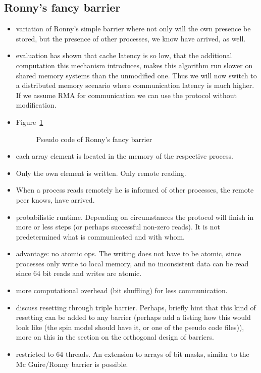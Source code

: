 \documentclass[a4paper, 10pt]{article}
\begin{document}
\subsection{Ronny's fancy barrier}
\label{ssec:new-fancy}
\begin{itemize}
	\item variation of Ronny's simple barrier where not only will the own presence be stored, but the presence of other processes, we know have arrived, as well.
	\item evaluation has shown that cache latency is so low, that the additional computation this mechanism introduces, makes this algorithm run slower on shared memory systems than the unmodified one. Thus we will now switch to a distributed memory scenario where communication latency is much higher. If we assume RMA for communication we can use the protocol without modification.
	\item Figure~\ref{fig:pseudo-code-ronny-fancy}
		\begin{figure}[htbp]
			\centering
			
			\caption{Pseudo code of Ronny's fancy barrier}
			\label{fig:pseudo-code-ronny-fancy}
		\end{figure}
	\item each array element is located in the memory of the respective process.
	\item Only the own element is written. Only remote reading.
	\item When a process reads remotely he is informed of other processes, the remote peer knows, have arrived.
	\item probabilistic runtime. Depending on circumstances the protocol will finish in more or less steps (or perhaps successful non-zero reads). It is not predetermined what is communicated and with whom.
	\item advantage: no atomic ops. The writing does not have to be atomic, since processes only write to local memory, and no inconsistent data can be read since 64 bit reads and writes are atomic.
	\item more computational overhead (bit shuffling) for less communication.
	\item discuss resetting through triple barrier. Perhaps, briefly hint that this kind of resetting can be added to any barrier (perhaps add a listing how this would look like (the spin model should have it, or one of the pseudo code files)), more on this in the section on the orthogonal design of barriers.
	\item restricted to 64 threads. An extension to arrays of bit masks, similar to the Mc Guire/Ronny barrier is possible.
\end{itemize}
\end{document}
